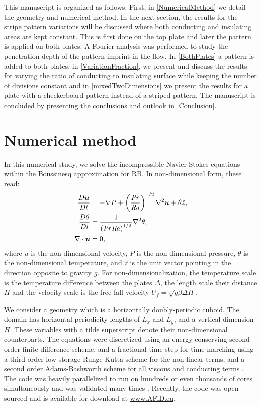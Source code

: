 \documentclass{jfm}
\newcommand\Pran{\mbox{\textit{Pr}}} %
\newcommand\Ray{\mbox{\textit{Ra}}}  %
\begin{document}
This manuscript is organized as follows: First, in \autoref{NumericalMethod}
we detail the geometry and numerical method.  In the next section, the results
for the stripe pattern variations will be discussed where both conducting and
insulating areas are kept constant.  This is first done on the top plate and
later the pattern is applied on both plates.  A Fourier analysis was performed
to study the penetration depth of the pattern imprint in the flow.  In
\autoref{BothPlates} a pattern is added to both plates, in
\autoref{VariationFraction}, we present and discuss the results for varying
the ratio of conducting to insulating surface while keeping the number of
divisions constant and in \autoref{mixedTwoDimensions} we present the results
for a plate with a checkerboard pattern instead of a striped pattern.  The
manuscript is concluded by presenting the conclusions and outlook in
\autoref{Conclusion}.

\section{Numerical method}\label{NumericalMethod}

In this numerical study, we solve the incompressible Navier-Stokes equations
within the Boussinesq approximation for RB. In non-dimensional form, these
read:
%
\begin{equation} \begin{aligned} \frac{D \boldsymbol{u}}{Dt} &= -\nabla P +
    \left( \frac{\Pran}{\Ray} \right)^{1/2} \nabla^2 \boldsymbol{u} + \theta
    \hat{z}, \\ \frac{D \theta}{Dt} &= \frac{1}{\left( \Pran \Ray
    \right)^{1/2}} \nabla^2 \theta, \\ \nabla \cdot \boldsymbol{u} &= 0,
\end{aligned} \end{equation}
%
where $u$ is the non-dimensional velocity, $P$ is the non-dimensional
pressure, $\theta$ is the non-dimensional temperature, and $\hat{z}$ is the
unit vector pointing in the direction opposite to gravity $g$.  For
non-dimensionalization, the temperature scale is the temperature difference
between the plates $\Delta$, the length scale their distance $H$ and the
velocity scale is the free-fall velocity $U_f = \sqrt{g\beta \Delta H}$.

We consider a geometry which is a horizontally doubly-periodic cuboid. The
domain has horizontal periodicity lengths of $L_x$ and $L_y$, and a vertical
dimension $H$.  These variables with a tilde superscript denote their
non-dimensional counterparts.  The equations were discretized using an
energy-conserving second-order finite-difference scheme, and a fractional
time-step for time marching using a third-order low-storage Runge-Kutta scheme
for the non-linear terms, and a second order Adams-Bashworth scheme for all
viscous and conducting terms \citep{ver96,poe15}.  The code was heavily
parallelized to run on hundreds or even thousands of cores simultaneously and
was validated many times \citep{ste10,ste11, poe15}.  Recently, the code was
open-sourced and is available for download at \url{www.AFiD.eu}.
\end{document}
